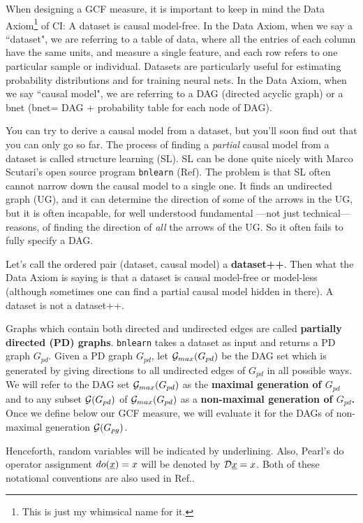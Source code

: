 \documentclass[12pt]{article}
\begin{document}
When designing a GCF measure,
it is important to keep
in mind the Data Axiom\footnote{
This is just my whimsical name for it.} of CI: A dataset is causal model-free.
 In the Data Axiom,
when we say a ``dataset", we are referring to  a table of data, where all
 the entries of each column have the same units, and 
measure a single feature, and each row refers to one
 particular sample or individual. Datasets are particularly 
useful for estimating probability distributions and for 
training neural nets. In the Data Axiom, when we say ``causal model", we are 
referring to a DAG (directed acyclic graph) or a bnet
 (bnet= DAG + probability table 
for each node of DAG).

You can try to derive a causal model from a dataset, 
but you'll soon find out that you can only go so far.
The process of finding a {\it partial} causal model from a dataset 
is called structure learning (SL).  SL can be done quite
 nicely with Marco Scutari's open source program 
{\tt bnlearn} (Ref\cite{bnlearn}).
The problem is that SL often cannot 
narrow down the causal model to a single one. It finds an undirected graph (UG), 
and it can determine the direction of some of the arrows in the UG, 
but it is often incapable, for well understood 
fundamental ---not just technical--- reasons,
 of finding the direction of {\it all}  the arrows of the UG. 
So it often fails to fully specify a DAG.

Let's call the ordered pair (dataset, causal model) a 
{\bf dataset++}.
 Then what the Data Axiom is saying is that a dataset 
is causal model-free or model-less (although sometimes one can 
find a partial causal model hidden in there). 
A dataset is not a dataset++.

Graphs
which contain both directed 
and undirected edges
are called 
{\bf partially directed (PD) graphs}.
{\tt bnlearn} takes
a dataset as input
and returns a PD graph
$G_{pd}$.
Given a PD graph $G_{pd}$,
let ${\cal G}_{max}(G_{pd})$
be the DAG set 
which 
is generated
by giving directions to all 
undirected edges of $G_{pd}$
in all possible ways.
We will refer to the
DAG set
 ${\cal G}_{max}(G_{pd})$ as the
 {\bf maximal generation of $G_{pd}$}
and to any subset ${\cal G}(G_{pd})$ of
${\cal G}_{max}(G_{pd})$ as a {\bf non-maximal 
generation of $G_{pd}$.}
Once we define below our
 GCF measure,
we will evaluate it for the DAGs of 
non-maximal generation ${\cal G}(G_{pg})$.




Henceforth, random variables
will be indicated by underlining.
Also, Pearl's do operator assignment $do({\underline{x}})=x$
will be denoted by ${\cal D}{\underline{x}} =x$.
Both
of these notational
conventions are also used in Ref.\cite{bayesuvius}.
\end{document}
